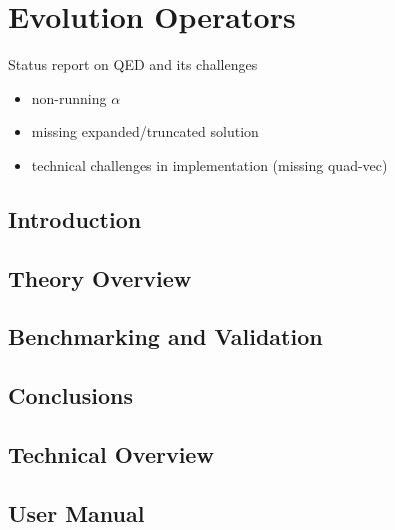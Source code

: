 
\chapter{Evolution Operators}
\label{ch:eko}
\minitoc
\adjustmtc

Status report on QED and its challenges

\begin{itemize}
	\item non-running $\alpha$
	\item missing expanded/truncated solution
	\item technical challenges in implementation (missing quad-vec)
\end{itemize}

\section{Introduction}
\label{sec:eko/intro}


\section{Theory Overview}
\label{sec:eko/theory}


\section{Benchmarking and Validation}
\label{sec:eko/pheno}


\section{Conclusions}
\label{sec:eko/concl}


\section{Technical Overview}
\label{app:eko/code}


\section{User Manual}
\label{app:eko/man}


